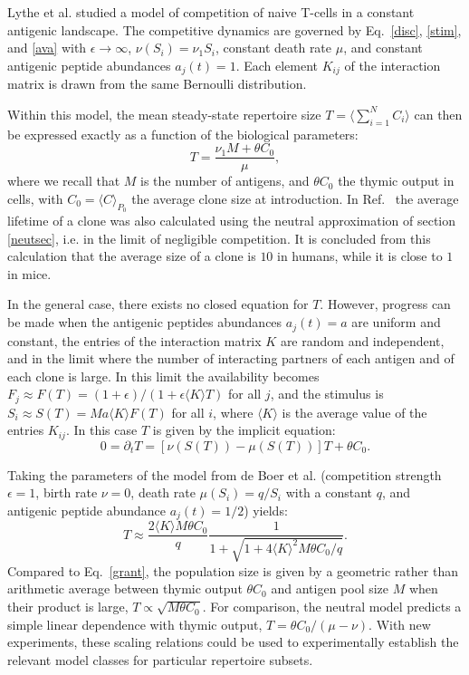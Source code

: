 \documentclass[aps,pre,twocolumn,superscriptaddress,groupedaddress]{revtex4}
\newcommand{\beq}{\begin{equation}}
\newcommand{\eeq}{\end{equation}}
\newcommand{\<}{\langle}
\renewcommand{\>}{\rangle}
\begin{document}
Lythe et al. \cite{Lythe2016} studied a model of competition of naive T-cells in a constant antigenic landscape. The competitive dynamics are governed by Eq.~\ref{disc}, \ref{stim}, and \ref{ava} with $\epsilon \to \infty$, $\nu(S_i)=\nu_1 S_i$, constant death rate $\mu$, and constant antigenic peptide abundances $a_j(t)=1$. Each element $K_{ij}$ of the interaction matrix is drawn from the same Bernoulli distribution.

Within this model, the mean steady-state repertoire size $T=\<\sum_{i=1}^N C_i\>$ can then be expressed exactly as a function of the biological parameters:
\beq
T=\frac{\nu_1 M+\theta C_0}{\mu},
\label{grant}
\eeq
where we recall that $M$ is the number of antigens, and $\theta C_0$ the thymic output in cells, with $C_0=\<C\>_{P_0}$ the average clone size at introduction. In Ref.~\cite{Lythe2016} the average lifetime of a clone was also {calculated using the neutral approximation of section \ref{neutsec}, i.e. in the limit of negligible competition}. It is concluded from this calculation that the average size of a clone is $10$ in humans, while it is close to $1$ in mice. 

In the general case, there exists no closed equation for $T$. However, progress can be made when  the antigenic peptides abundances $a_j(t)=a$ are uniform and constant, the entries of the interaction matrix $K$ are random and independent, and in the limit where the number of interacting partners of each antigen and of each clone is large. In this limit the availability becomes $F_j\approx F(T)= (1+\epsilon)/(1+\epsilon \<K\>T)$ for all $j$, and the stimulus is $S_i\approx S(T)=Ma \<K\> F(T)$ for all $i$, where $\<K\>$ is the average value of the entries $K_{ij}$. In this case $T$ is given by the implicit equation:
\beq
0=\partial_t T = [ \nu(S(T)) - \mu(S(T)) ] T + \theta C_0.
\eeq

Taking the parameters of the model from de Boer et al. \cite{DeBoer2001} (competition strength $\epsilon=1$, birth rate $\nu=0$, death rate $\mu(S_i)=q/S_i$ {with a constant $q$}, and antigenic peptide abundance $a_j(t)=1/2$) yields:
 \beq
 T \approx \frac{2\<K\>M\theta C_0}{q}\frac{1}{1+\sqrt{1+4\<K\>^2 M\theta C_0/q}}.
 \eeq
Compared to Eq.~\ref{grant}, the population size is given by a geometric rather than arithmetic average between thymic output $\theta C_0$ and antigen pool size $M$ when their product is large, $T\propto \sqrt{M\theta C_0}$.
For comparison, the neutral model predicts a simple linear dependence with thymic output, $T=\theta C_0/(\mu-\nu)$. {With new experiments, these scaling relations could be used to experimentally establish the relevant model classes for particular repertoire subsets.}
 
\end{document}

